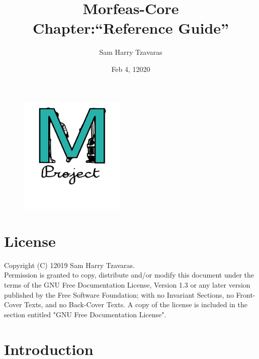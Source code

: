 \documentclass{article}
\title{Morfeas-Core\\Chapter:``Reference Guide''}
\date{Feb 4, 12020}
\author{Sam Harry Tzavaras}
\begin{document}
\clearpage
\begin{figure}
\centering
  \includegraphics[width=2in]{ArtWork/Morfeas_logo_cyan.png}
\end{figure}
\maketitle
\thispagestyle{empty}
\newpage
\section{License}
Copyright (C)  12019  Sam Harry Tzavaras.\\
Permission is granted to copy, distribute and/or modify this document
under the terms of the GNU Free Documentation License, Version 1.3
or any later version published by the Free Software Foundation;
with no Invariant Sections, no Front-Cover Texts, and no Back-Cover Texts.
A copy of the license is included in the section entitled "GNU
Free Documentation License".
\newpage
\newpage
\tableofcontents
\newpage

\section{Introduction}
\end{document}
